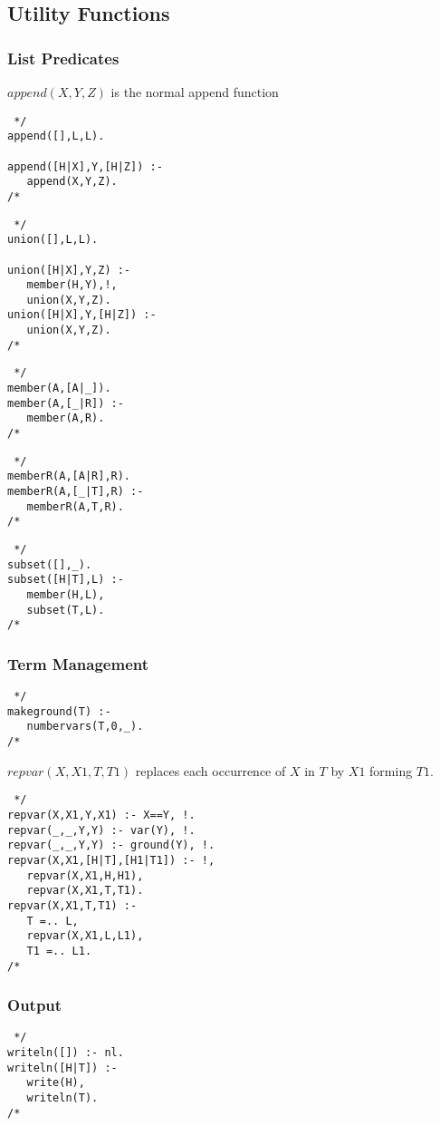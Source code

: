 \documentclass[11pt,fleqn]{article}
\begin{document}
\subsection{Utility Functions}
\subsubsection{List Predicates}
$append(X,Y,Z)$ is the normal append function
\begin{verbatim} */
append([],L,L).

append([H|X],Y,[H|Z]) :-
   append(X,Y,Z).
/* \end{verbatim}
\begin{verbatim} */
union([],L,L).

union([H|X],Y,Z) :-
   member(H,Y),!,
   union(X,Y,Z).
union([H|X],Y,[H|Z]) :-
   union(X,Y,Z).
/* \end{verbatim}

\begin{verbatim} */
member(A,[A|_]).
member(A,[_|R]) :-
   member(A,R).
/* \end{verbatim}
\begin{verbatim} */
memberR(A,[A|R],R).
memberR(A,[_|T],R) :-
   memberR(A,T,R).
/* \end{verbatim}
\begin{verbatim} */
subset([],_).
subset([H|T],L) :-
   member(H,L),
   subset(T,L).
/* \end{verbatim}
\subsubsection{Term Management}

\begin{verbatim} */
makeground(T) :-
   numbervars(T,0,_).
/* \end{verbatim}

$repvar(X,X1,T,T1)$ replaces each occurrence of $X$ in $T$ by $X1$ forming $T1$.
\begin{verbatim} */
repvar(X,X1,Y,X1) :- X==Y, !.
repvar(_,_,Y,Y) :- var(Y), !.
repvar(_,_,Y,Y) :- ground(Y), !.
repvar(X,X1,[H|T],[H1|T1]) :- !,
   repvar(X,X1,H,H1),
   repvar(X,X1,T,T1).
repvar(X,X1,T,T1) :-
   T =.. L,
   repvar(X,X1,L,L1),
   T1 =.. L1.
/* \end{verbatim}

\subsubsection{Output}
\begin{verbatim} */
writeln([]) :- nl.
writeln([H|T]) :-
   write(H),
   writeln(T).
/* \end{verbatim}

%
%
\end{document}
